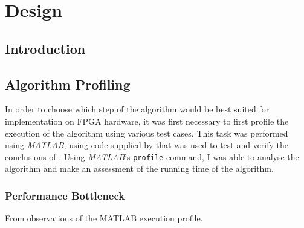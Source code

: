 \chapter{Design}
\label{ch:design}

\section{Introduction}
\label{sec:designIntroduction}

\section{Algorithm Profiling}
\label{sec:algorithmProfiling}
In order to choose which step of the algorithm would be best suited for 
implementation on FPGA hardware, it was first necessary to first profile the 
execution of the algorithm using various test cases. This task was performed 
using \emph{MATLAB}, using code supplied by \citeauthor{Khoa:2012} that was used
to test and verify the conclusions of . Using 
\emph{MATLAB}'s \verb+profile+ command, I was able to analyse the algorithm and 
make an assessment of the running time of the algorithm.

\subsection{Performance Bottleneck}
\label{sec:algorithmPerformanceBottleneck}
From observations of the MATLAB execution profile.
